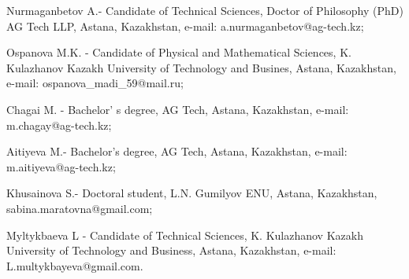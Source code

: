 \begin{info}
Nurmaganbetov A.- Candidate of Technical Sciences, Doctor of
Philosophy (PhD) AG Tech LLP, Astana, Kazakhstan, e-mail:
a.nurmaganbetov@ag-tech.kz;

Ospanova M.K. - Candidate of Physical and Mathematical Sciences, K.
Kulazhanov Kazakh University of Technology and Busines, Astana,
Kazakhstan, e-mail: ospanova\_madi\_59@mail.ru;

Chagai M. - Bachelor' s degree, AG Tech, Astana, Kazakhstan, e-mail:
m.chagay@ag-tech.kz;

Aitiyeva M.- Bachelor's degree, AG Tech, Astana, Kazakhstan, e-mail:
m.aitiyeva@ag-tech.kz;

Khusainova S.- Doctoral student, L.N. Gumilyov ENU, Astana,
Kazakhstan, sabina.maratovna@gmail.com;

Myltykbaeva L - Candidate of Technical Sciences, K. Kulazhanov Kazakh
University of Technology and Business, Astana, Kazakhstan, e-mail:
L.multykbayeva@gmail.com.
\end{info}
